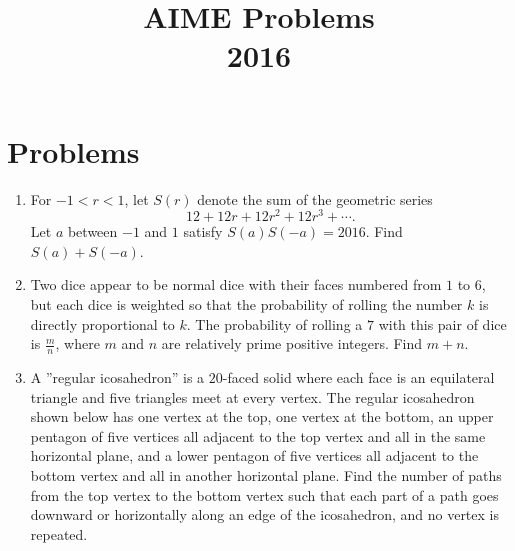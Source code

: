 \documentclass{article}
\title{AIME Problems \\ 2016}
\date{}
\begin{document}
\maketitle\thispagestyle{fancy}\newpage\section*{Problems}\begin{enumerate}[label=\arabic*., itemsep=0.5em]\item For $-1<r<1$, let $S(r)$ denote the sum of the geometric series 
\begin{equation*}
12+12r+12r^2+12r^3+\cdots .
\end{equation*}
  Let $a$ between $-1$ and $1$ satisfy $S(a)S(-a)=2016$. Find $S(a)+S(-a)$.\par \vspace{0.5em}\item Two dice appear to be normal dice with their faces numbered from $1$ to $6$, but each dice is weighted so that the probability of rolling the number $k$ is directly proportional to $k$. The probability of rolling a $7$ with this pair of dice is $\frac{m}{n}$, where $m$ and $n$ are relatively prime positive integers. Find $m+n$.\par \vspace{0.5em}\item A ''regular icosahedron'' is a $20$-faced solid where each face is an equilateral triangle and five triangles meet at every vertex. The regular icosahedron shown below has one vertex at the top, one vertex at the bottom, an upper pentagon of five vertices all adjacent to the top vertex and all in the same horizontal plane, and a lower pentagon of five vertices all adjacent to the bottom vertex and all in another horizontal plane. Find the number of paths from the top vertex to the bottom vertex such that each part of a path goes downward or horizontally along an edge of the icosahedron, and no vertex is repeated.


\end{enumerate}
\end{document}
